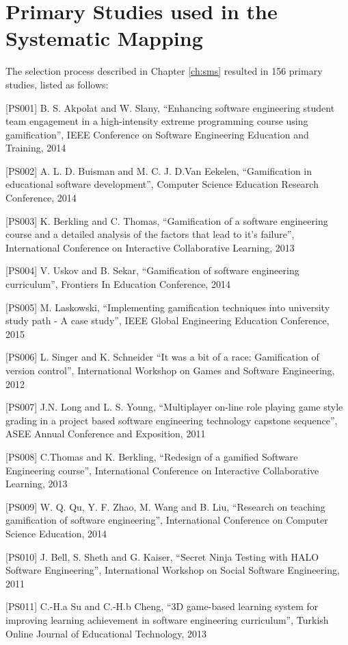 \chapter{Primary Studies used in the Systematic Mapping}
\label{ch:primarystudies}

The selection process described in Chapter \ref{ch:sms} resulted in 156 primary studies, listed as follows:

[PS001]	B. S. Akpolat and W. Slany, “Enhancing software engineering student team engagement in a high-intensity extreme programming course using gamification”, IEEE Conference on Software Engineering Education and Training, 2014


[PS002]	A. L. D. Buisman and M. C. J. D.Van Eekelen, “Gamification in educational software development”, Computer Science Education Research Conference, 2014


[PS003]	K. Berkling and C. Thomas, “Gamification of a software engineering course and a detailed analysis of the factors that lead to it's failure”, International Conference on Interactive Collaborative Learning, 2013


[PS004]	V. Uskov and B. Sekar, “Gamification of software engineering curriculum”, Frontiers In Education Conference, 2014

[PS005]	M. Laskowski, “Implementing gamification techniques into university study path - A case study”, IEEE Global Engineering Education Conference, 2015


[PS006]	L. Singer and K. Schneider “It was a bit of a race: Gamification of version control”, International Workshop on Games and Software Engineering, 2012


[PS007]	J.N. Long and L. S. Young, “Multiplayer on-line role playing game style grading in a project based software engineering technology capstone sequence”, ASEE Annual Conference and Exposition, 2011


[PS008]	C.Thomas and K. Berkling, “Redesign of a gamified Software Engineering course”, International Conference on Interactive Collaborative Learning, 2013

[PS009]	W. Q. Qu, Y. F. Zhao, M. Wang and B. Liu, “Research on teaching gamification of software engineering”, International Conference on Computer Science Education, 2014

[PS010]	J. Bell, S. Sheth and G. Kaiser, “Secret Ninja Testing with HALO Software Engineering”, International Workshop on Social Software Engineering, 2011

[PS011]	C.-H.a Su and C.-H.b Cheng, “3D game-based learning system for improving learning achievement in software engineering curriculum”, Turkish Online Journal of Educational Technology, 2013

